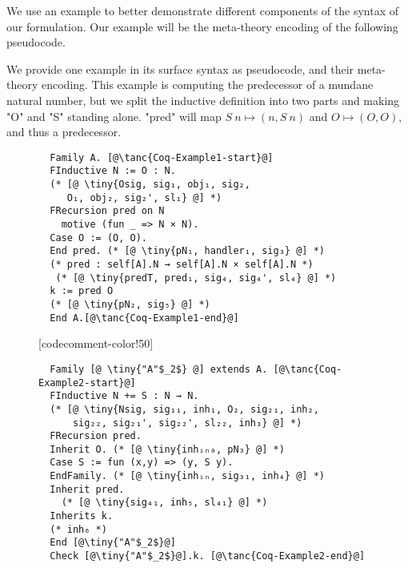 We use an example to better demonstrate different components of the
syntax of our formulation. Our example will be the meta-theory encoding
of the following pseudocode.

We provide one example in its surface syntax as pseudocode, and their
meta-theory encoding. This example is computing the predecessor of a
mundane natural number, but we split the inductive definition into two
parts and making "O" and "S" standing alone.
"pred" will map $S~n \mapsto (n, S~n)$ and $O \mapsto (O, O)$, and thus a predecessor.

\begin{figure}[!htb]\label{fig:example-pseudocode}
  
  \begin{minipage}{\textwidth}
  \begin{multicols}{2}
  
  
  
  
  \begin{lstlisting} 
  Family A. [@\tanc{Coq-Example1-start}@]
  FInductive N := O : N. 
  (* [@ \tiny{Osig, sig₁, obj₁, sig₂,
     O₁, obj₂, sig₂', sl₁} @] *)
  FRecursion pred on N
    motive (fun _ => N × N).
  Case O := (O, O). 
  End pred. (* [@ \tiny{pN₁, handler₁, sig₃} @] *)
  (* pred : self[A].N → self[A].N × self[A].N *)
   (* [@ \tiny{predT, pred₁, sig₄, sig₄', sl₄} @] *) 
  k := pred O 
  (* [@ \tiny{pN₂, sig₅} @] *)  
  End A.[@\tanc{Coq-Example1-end}@]
  \end{lstlisting}
  
  [codecomment-color!50]
  
  
  \columnbreak
  
  
  
  
  \begin{lstlisting}
  Family [@ \tiny{"A"$_2$} @] extends A. [@\tanc{Coq-Example2-start}@]
  FInductive N += S : N → N.
  (* [@ \tiny{Nsig, sig₁₁, inh₁, O₂, sig₂₁, inh₂, 
      sig₂₂, sig₂₁', sig₂₂', sl₂₂, inh₃} @] *)
  FRecursion pred.
  Inherit O. (* [@ \tiny{inhᵢₙ₀, pN₃} @] *)
  Case S := fun (x,y) => (y, S y).
  EndFamily. (* [@ \tiny{inhᵢₙ, sig₃₁, inh₄} @] *)
  Inherit pred.
    (* [@ \tiny{sig₄₁, inh₅, sl₄₁} @] *)
  Inherits k. 
  (* inh₆ *)
  End [@\tiny{"A"$_2$}@]
  Check [@\tiny{"A"$_2$}@].k. [@\tanc{Coq-Example2-end}@]
  \end{lstlisting}
  

\end{multicols}
\end{minipage}
\end{figure}
